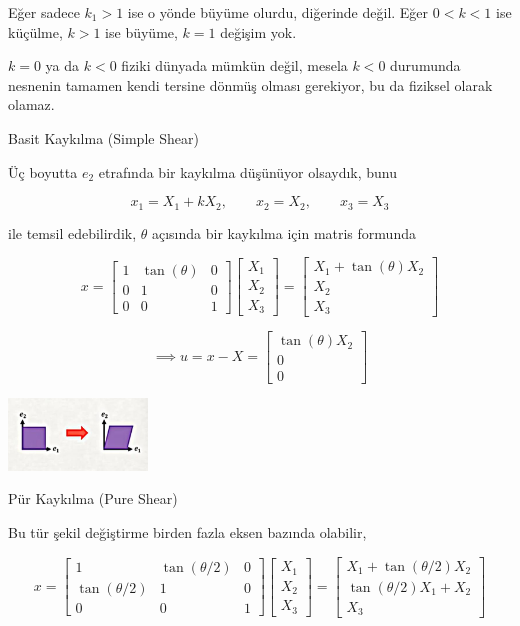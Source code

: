 \documentclass[12pt,fleqn]{article}\usepackage{../../common}
\begin{document}
Eğer sadece $k_1 > 1$ ise o yönde büyüme olurdu, diğerinde değil. Eğer
$0 < k < 1$ ise küçülme, $k > 1$ ise büyüme, $k = 1$ değişim yok.

$k=0$ ya da $k<0$ fiziki dünyada mümkün değil, mesela $k<0$ durumunda nesnenin
tamamen kendi tersine dönmüş olması gerekiyor, bu da fiziksel olarak olamaz.

Basit Kaykılma (Simple Shear)

Üç boyutta $e_2$ etrafında bir kaykılma düşünüyor olsaydık, bunu

$$
x_1 = X_1 + k X_2, \qquad x_2 = X_2, \qquad x_3 = X_3
$$

ile temsil edebilirdik, $\theta$ açısında bir kaykılma için matris formunda

$$
x = \left[\begin{array}{ccc}
1 & \tan(\theta) & 0 \\
0 & 1 & 0 \\
0 & 0 & 1 
\end{array}\right]
\left[\begin{array}{c}
X_1 \\ X_2 \\ X_3
\end{array}\right] =
\left[\begin{array}{c}
X_1 + \tan(\theta) X_2 \\
X_2 \\
X_3
\end{array}\right] 
$$

$$
\implies u = x - X =
\left[\begin{array}{ccc}
\tan(\theta) X_2 \\
0 \\
0
\end{array}\right]
$$

\includegraphics[width=10em]{phy_020_strs_01_07.jpg}

Pür Kaykılma (Pure Shear)

Bu tür şekil değiştirme birden fazla eksen bazında olabilir,

$$
x = \left[\begin{array}{ccc}
1               & \tan(\theta/2) & 0 \\
\tan(\theta/2) & 1              & 0 \\
0               & 0              & 1 
\end{array}\right]
\left[\begin{array}{c}
X_1 \\ X_2 \\ X_3
\end{array}\right] =
\left[\begin{array}{c}
X_1 + \tan(\theta/2) X_2 \\
\tan(\theta/2) X_1 + X_2  \\
X_3
\end{array}\right] 
$$
\end{document}
